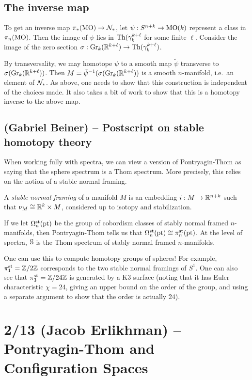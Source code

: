 \documentclass{article}
\begin{document}
\subsection{The inverse map}

To get an inverse map $\pi_*(\mathrm{MO}) \to \mathcal{N}_*$, let $\psi: S^{n+k} \to \mathrm{MO}(k)$ represent a class in $\pi_n(\mathrm{MO})$.
Then the image of $\psi$ lies in $\operatorname{Th}(\gamma_k^{k + \ell}$ for some finite $\ell$.
Consider the image of the zero section $\sigma: \operatorname{Gr}_k(\mathbb{R}^{k+\ell}) \to \operatorname{Th}(\gamma_k^{k + \ell})$.

By transversality, we may homotope $\psi$ to a smooth map $\tilde{\psi}$ transverse to $\sigma(\operatorname{Gr}_k(\mathbb{R}^{k+\ell}))$.
Then $M = \tilde{\psi}^{-1}(\sigma(\operatorname{Gr}_k(\mathbb{R}^{k+\ell}))$ is a smooth $n$-manifold, i.e.\ an element of $\mathcal{N}_*$.
As above, one needs to show that this construction is independent of the choices made.
It also takes a bit of work to show that this is a homotopy inverse to the above map.

\subsection{(Gabriel Beiner) -- Postscript on stable homotopy theory}

When working fully with spectra, we can view a version of Pontryagin-Thom as saying that the sphere spectrum is a Thom spectrum.
More precisely, this relies on the notion of a stable normal framing.

\begin{dfn}
	A \emph{stable normal framing} of a manifold $M$ is an embedding $i: M \to \mathbb{R}^{n+k}$ such that $\nu_M \cong \mathbb{R}^k \times M$, considered up to isotopy and stabilization.
\end{dfn}

If we let $\Omega_n^{\mathrm{st}}(\mathrm{pt})$ be the group of cobordism classes of stably normal framed $n$-manifolds, then Pontryagin-Thom tells us that $\Omega_n^{\mathrm{st}}(\mathrm{pt}) \cong \pi_n^{\mathrm{st}}(\mathrm{pt})$.
At the level of spectra, $\mathbb{S}$ is the Thom spectrum of stably normal framed $n$-manifolds.

One can use this to compute homotopy groups of spheres!
For example, $\pi_1^{\mathrm{st}} = \mathbb{Z} / 2 \mathbb{Z}$ corresponds to the two stable normal framings of $S^1$.
One can also see that $\pi_3^{\mathrm{st}} = \mathbb{Z} / 24 \mathbb{Z}$ is generated by a K3 surface (noting that it has Euler characteristic $\chi = 24$, giving an upper bound on the order of the group, and using a separate argument to show that the order is actually 24).

\section{2/13 (Jacob Erlikhman) -- Pontryagin-Thom and Configuration Spaces}
\end{document}

